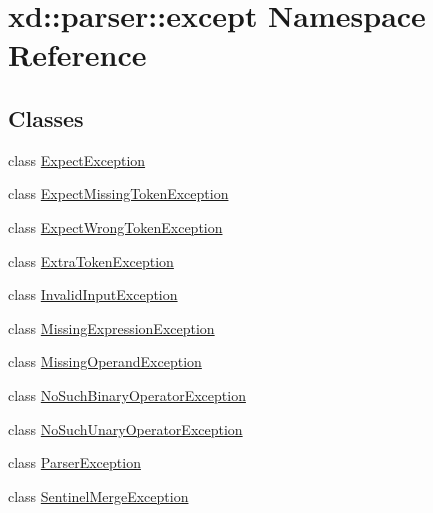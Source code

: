 \hypertarget{namespacexd_1_1parser_1_1except}{}\section{xd\+:\+:parser\+:\+:except Namespace Reference}
\label{namespacexd_1_1parser_1_1except}
\subsection*{Classes}
\begin{DoxyCompactItemize}
\item 
class \mbox{\hyperlink{classxd_1_1parser_1_1except_1_1_expect_exception}{Expect\+Exception}}
\item 
class \mbox{\hyperlink{classxd_1_1parser_1_1except_1_1_expect_missing_token_exception}{Expect\+Missing\+Token\+Exception}}
\item 
class \mbox{\hyperlink{classxd_1_1parser_1_1except_1_1_expect_wrong_token_exception}{Expect\+Wrong\+Token\+Exception}}
\item 
class \mbox{\hyperlink{classxd_1_1parser_1_1except_1_1_extra_token_exception}{Extra\+Token\+Exception}}
\item 
class \mbox{\hyperlink{classxd_1_1parser_1_1except_1_1_invalid_input_exception}{Invalid\+Input\+Exception}}
\item 
class \mbox{\hyperlink{classxd_1_1parser_1_1except_1_1_missing_expression_exception}{Missing\+Expression\+Exception}}
\item 
class \mbox{\hyperlink{classxd_1_1parser_1_1except_1_1_missing_operand_exception}{Missing\+Operand\+Exception}}
\item 
class \mbox{\hyperlink{classxd_1_1parser_1_1except_1_1_no_such_binary_operator_exception}{No\+Such\+Binary\+Operator\+Exception}}
\item 
class \mbox{\hyperlink{classxd_1_1parser_1_1except_1_1_no_such_unary_operator_exception}{No\+Such\+Unary\+Operator\+Exception}}
\item 
class \mbox{\hyperlink{classxd_1_1parser_1_1except_1_1_parser_exception}{Parser\+Exception}}
\item 
class \mbox{\hyperlink{classxd_1_1parser_1_1except_1_1_sentinel_merge_exception}{Sentinel\+Merge\+Exception}}
\end{DoxyCompactItemize}
